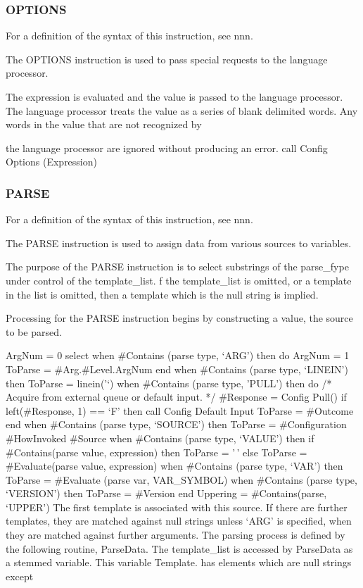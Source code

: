 \subsubsection{OPTIONS}\label{options}

For a definition of the syntax of this instruction, see nnn.

The OPTIONS instruction is used to pass special requests to the language
processor.

The expression is evaluated and the value is passed to the language
processor. The language processor treats the value as a series of blank
delimited words. Any words in the value that are not recognized by

the language processor are ignored without producing an error. call
Config Options (Expression)

\subsubsection{PARSE}\label{parse}

For a definition of the syntax of this instruction, see nnn.

The PARSE instruction is used to assign data from various sources to
variables.

The purpose of the PARSE instruction is to select substrings of the
parse\_fype under control of the template\_list. \textbar f the
template\_list is omitted, or a template in the list is omitted, then a
template which is the null string is implied.

Processing for the PARSE instruction begins by constructing a value, the
source to be parsed.

ArgNum = 0 select when \#Contains (parse type, `ARG') then do ArgNum = 1
ToParse = \#Arg.\#Level.ArgNum end when \#Contains (parse type,
`LINEIN') then ToParse = linein('`) when \#Contains (parse type, 'PULL')
then do /* Acquire from external queue or default input. */ \#Response =
Config Pull() if left(\#Response, 1) == `F' then call Config Default
Input ToParse = \#Outcome end when \#Contains (parse type, `SOURCE')
then ToParse = \#Configuration \#HowInvoked \#Source when \#Contains
(parse type, `VALUE') then if \#Contains(parse value, expression) then
ToParse = '\,' else ToParse = \#Evaluate(parse value, expression) when
\#Contains (parse type, `VAR') then ToParse = \#Evaluate (parse var,
VAR\_SYMBOL) when \#Contains (parse type, `VERSION') then ToParse =
\#Version end Uppering = \#Contains(parse, `UPPER') The first template
is associated with this source. If there are further templates, they are
matched against null strings unless `ARG' is specified, when they are
matched against further arguments. The parsing process is defined by the
following routine, ParseData. The template\_list is accessed by
ParseData as a stemmed variable. This variable Template. has elements
which are null strings except

